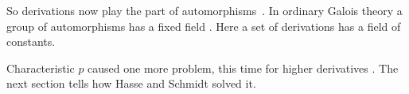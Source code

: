 So derivations now play the part of automorphisms~\cite[p.~645]{Jacobson1944}. In ordinary Galois theory a
group of automorphisms has a fixed field \cite[p.~645]{Jacobson1944}. Here a
set of derivations has a field of constants.

Characteristic $p$ caused one more problem, this time for higher derivatives
\cite{HasseSchmidt1937}. The next section tells how Hasse and Schmidt solved
it.
